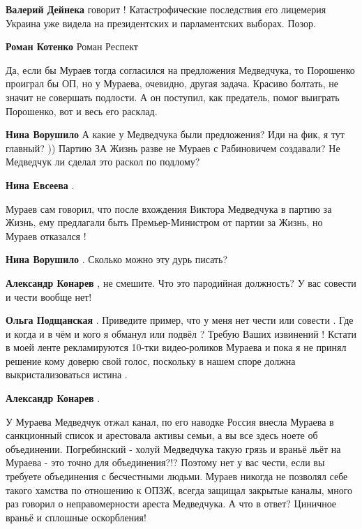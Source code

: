 \begin{itemize}
\begin{itemize}
\textbf{Валерий Дейнека} говорит ! Катастрофические последствия его лицемерия Украина уже видела на президентских и парламентских выборах. Позор.

\textbf{Роман Котенко} Роман Респект

\end{itemize} %


Да, если бы Мураев тогда согласился на предложения Медведчука, то Порошенко
проиграл бы ОП, но у Мураева, очевидно, другая задача. Красиво болтать, не
значит не совершать подлости. А он поступил, как предатель, помог выиграть
Порошенко, вот и весь его расклад.

\begin{itemize} %
\textbf{Нина Ворушило} А какие у Медведчука были предложения? Иди на фик, я тут главный? )) Партию ЗА Жизнь разве не Мураев с Рабиновичем создавали? Не Медведчук ли сделал это раскол по подлому?

\textbf{Нина Евсеева} .

Мураев сам говорил, что после вхождения Виктора Медведчука в партию за Жизнь,
ему предлагали быть Премьер-Министром от партии за Жизнь, но Мураев отказался !


\textbf{Нина Ворушило} . Сколько можно эту дурь писать?

\textbf{Александр Конарев} , не смешите. Что это пародийная должность? У вас совести и чести вообще нет!

\textbf{Ольга Подщанская} .
Приведите пример, что у меня нет чести или совести .
Где и когда и в чём и кого я обманул или подвёл ?
Требую Ваших извинений !
Кстати в моей ленте рекламируются 10-тки видео-роликов Мураева и пока я не принял решение кому доверю свой голос, поскольку в нашем споре должна выкристализоваться истина .

\textbf{Александр Конарев} . 

У Мураева Медведчук отжал канал, по его наводке Россия внесла Мураева в
санкционный список и арестовала активы семьи, а вы все здесь ноете об
объединении. Погребинский - холуй Медведчука такую грязь и враньё льёт на
Мураева - это точно для объединения?!? Поэтому нет у вас чести, если вы
требуете объединения с бесчестными людьми. Мураев никогда не позволял себе
такого хамства по отношению к ОПЗЖ, всегда защищал закрытые каналы, много раз
говорил о неправомерности ареста Медведчука. А что в ответ? Циничное враньё и
сплошные оскорбления!


\end{itemize}
\end{itemize}

